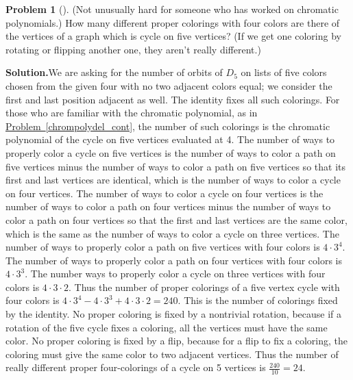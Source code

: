 \documentclass[10pt,]{book}
\theoremstyle{plain}
\theoremstyle{definition}
\newtheorem{activity}[project]{Problem}
\theoremstyle{definition}
\numberwithin{equation}{chapter}
\begin{document}
\begin{activity}[]\label{activity-308}
(Not unusually hard for someone who has worked on chromatic polynomials.) How many different proper colorings with four colors are there of the vertices of a graph which is cycle on five vertices? (If we get one coloring by rotating or flipping another one, they aren't really different.)%
\par\medskip\noindent%
\textbf{Solution.}\quad We are asking for the number of orbits of \(D_5\) on lists of five colors chosen from the given four with no two adjacent colors equal; we consider the first and last position adjacent as well. The identity fixes all such colorings. For those who are familiar with the chromatic polynomial, as in \hyperref[chrompolydel_cont]{Problem~\ref{chrompolydel_cont}}, the number of such colorings is the chromatic polynomial of the cycle on five vertices evaluated at 4. The number of ways to properly color a cycle on five vertices is the number of ways to color a path on five vertices minus the number of ways to color a path on five vertices so that its first and last vertices are identical, which is the number of ways to color a cycle on four vertices. The number of ways to color a cycle on four vertices is the number of ways to color a path on four vertices minus the number of ways to color a path on four vertices so that the first and last vertices are the same color, which is the same as the number of ways to color a cycle on three vertices. The number of ways to properly color a path on five vertices with four colors is \(4\cdot3^4\). The number of ways to properly color a path on four vertices with four colors is \(4\cdot3^3\). The number ways to properly color a cycle on three vertices with four colors is \(4\cdot3\cdot2\). Thus the number of proper colorings of a five vertex cycle with four colors is \(4\cdot3^4-4\cdot3^3
+4\cdot3\cdot2=240\). This is the number of colorings fixed by the identity. No proper coloring is fixed by a nontrivial rotation, because if a rotation of the five cycle fixes a coloring, all the vertices must have the same color. No proper coloring is fixed by a flip, because for a flip to fix a coloring, the coloring must give the same color to two adjacent vertices. Thus the number of really different proper four-colorings of a cycle on 5 vertices is \(\frac{240}{10}=24\).%
\end{activity}
\end{document}
